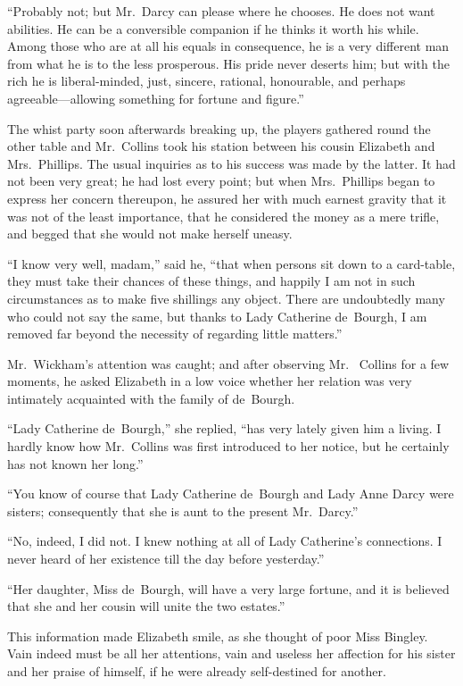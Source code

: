 ``Probably not; but Mr.\ Darcy can please where he chooses.  He
does not want abilities.  He can be a conversible companion if he
thinks it worth his while.  Among those who are at all his equals
in consequence, he is a very different man from what he is to the
less prosperous.  His pride never deserts him; but with the rich
he is liberal-minded, just, sincere, rational, honourable, and
perhaps agreeable---allowing something for fortune and figure.''

The whist party soon afterwards breaking up, the players
gathered round the other table and Mr.\ Collins took his station
between his cousin Elizabeth and Mrs.\ Phillips.  The usual
inquiries as to his success was made by the latter.  It had not
been very great; he had lost every point; but when Mrs.\ Phillips
began to express her concern thereupon, he assured her with
much earnest gravity that it was not of the least importance, that
he considered the money as a mere trifle, and begged that she
would not make herself uneasy.

``I know very well, madam,'' said he, ``that when persons sit down
to a card-table, they must take their chances of these things, and
happily I am not in such circumstances as to make five shillings
any object.  There are undoubtedly many who could not say the
same, but thanks to Lady Catherine de~Bourgh, I am removed
far beyond the necessity of regarding little matters.''

Mr.\ Wickham's attention was caught; and after observing Mr.\ %
Collins for a few moments, he asked Elizabeth in a low voice
whether her relation was very intimately acquainted with the
family of de~Bourgh.

``Lady Catherine de~Bourgh,'' she replied, ``has very lately given
him a living.  I hardly know how Mr.\ Collins was first
introduced to her notice, but he certainly has not known her
long.''

``You know of course that Lady Catherine de~Bourgh and Lady
Anne Darcy were sisters; consequently that she is aunt to the
present Mr.\ Darcy.''

``No, indeed, I did not.  I knew nothing at all of Lady Catherine's
connections.  I never heard of her existence till the day before
yesterday.''

``Her daughter, Miss de~Bourgh, will have a very large fortune,
and it is believed that she and her cousin will unite the two
estates.''

This information made Elizabeth smile, as she thought of poor
Miss Bingley.  Vain indeed must be all her attentions, vain and
useless her affection for his sister and her praise of himself,
if he were already self-destined for another.

